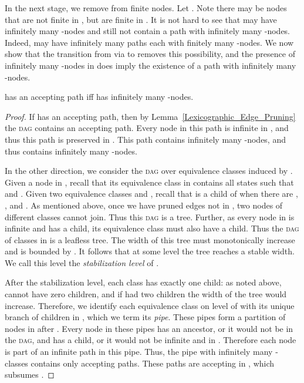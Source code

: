 \documentclass{LMCS}
\newcommand{\DAG}{\textsc{dag}\xspace}
\begin{document}
In the next stage, we remove from  finite nodes. Let 
.  Note there may be
nodes that are not finite in , but are finite in .  It is not
hard to see that  may have infinitely many -nodes and still not contain a path with
infinitely many -nodes.  Indeed,  may have infinitely many paths each with finitely many
-nodes. We now show that the transition from  via  to  removes this
possibility, and the presence of infinitely many -nodes in  does imply the existence
of a path with infinitely many -nodes.

\begin{lem}\label{Lexicographic_Node_Pruning}
 has an accepting path iff  has infinitely many -nodes.
\end{lem}
\begin{proof}
If  has an accepting path, then by Lemma~\ref{Lexicographic_Edge_Pruning} the \DAG 
contains an accepting path. Every node in this path is infinite in , and thus this path is
preserved in . This path contains infinitely many -nodes, and thus 
contains infinitely many -nodes.

In the other direction, we consider the \DAG over equivalence classes induced by .
Given a node  in , recall that its equivalence class in  contains all
states  such that  and . Given two equivalence classes  and ,
recall that  is a child of  when there are ,  , and  . As
mentioned above, once we have pruned edges not in , two nodes of different 
classes cannot join. Thus this \DAG is a tree.  Further, as every node  in  is
infinite and has a child, its equivalence class must also have a child.  Thus the \DAG of
classes in  is a leafless tree. The width of this tree must monotonically
increase and is bounded by . It follows that at some level  the tree reaches a stable width. We call this
level  the \emph{stabilization level} of .

After the stabilization level, each class  has exactly one child: as noted above, 
cannot have zero children, and if  had two children the width of the tree would increase.
Therefore, we identify each equivalence class on level  of  with its unique branch of
children in , which we term its \emph{pipe}. These pipes form a
partition of nodes in  after . Every node in these pipes has an ancestor, or it would not
be in the \DAG, and has a child, or it would not be infinite and in . Therefore each
node is part of an infinite path in this pipe.  Thus, the pipe with infinitely many
-classes contains only accepting paths. These paths are accepting in , which
subsumes .
\end{proof}
\end{document}
